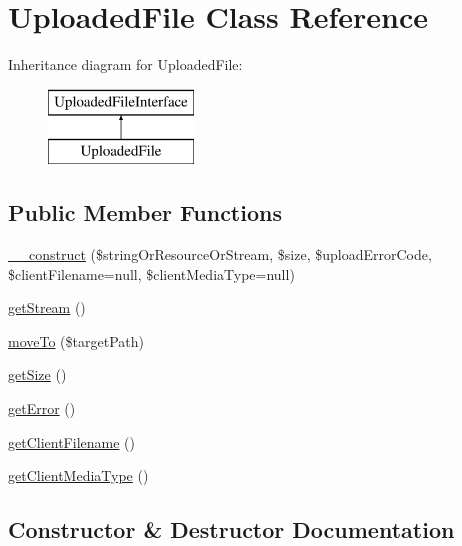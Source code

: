 \hypertarget{class_pes_1_1_http_1_1_uploaded_file}{}\section{Uploaded\+File Class Reference}
\label{class_pes_1_1_http_1_1_uploaded_file}
Inheritance diagram for Uploaded\+File\+:\begin{figure}[H]
\begin{center}
\leavevmode
\includegraphics[height=2.000000cm]{class_pes_1_1_http_1_1_uploaded_file}
\end{center}
\end{figure}
\subsection*{Public Member Functions}
\begin{DoxyCompactItemize}
\item 
\mbox{\hyperlink{class_pes_1_1_http_1_1_uploaded_file_a7edb5dda28e9dfcc490612479e7954e2}{\+\_\+\+\_\+construct}} (\$string\+Or\+Resource\+Or\+Stream, \$size, \$upload\+Error\+Code, \$client\+Filename=null, \$client\+Media\+Type=null)
\item 
\mbox{\hyperlink{class_pes_1_1_http_1_1_uploaded_file_a3e5834ff3daeecd091712270886a16fb}{get\+Stream}} ()
\item 
\mbox{\hyperlink{class_pes_1_1_http_1_1_uploaded_file_aeb023efe2fe8021dc83b523bac55a9a3}{move\+To}} (\$target\+Path)
\item 
\mbox{\hyperlink{class_pes_1_1_http_1_1_uploaded_file_a75cce10cdf81be6dc84881c28b3379b7}{get\+Size}} ()
\item 
\mbox{\hyperlink{class_pes_1_1_http_1_1_uploaded_file_a24ada5decce3d1b79cd82f5a90ccf404}{get\+Error}} ()
\item 
\mbox{\hyperlink{class_pes_1_1_http_1_1_uploaded_file_ace985ea32f42a84e765b941aee6a74dd}{get\+Client\+Filename}} ()
\item 
\mbox{\hyperlink{class_pes_1_1_http_1_1_uploaded_file_a0eb11010787d58d8be9c35f607e51b31}{get\+Client\+Media\+Type}} ()
\end{DoxyCompactItemize}


\subsection{Constructor \& Destructor Documentation}
\mbox{\label{class_pes_1_1_http_1_1_uploaded_file_a7edb5dda28e9dfcc490612479e7954e2}} 
